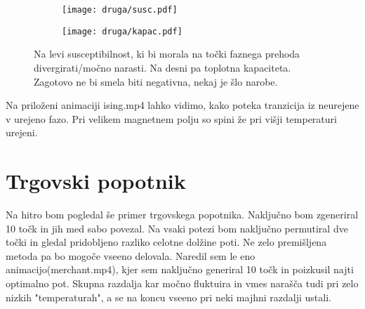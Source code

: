 \documentclass{article}
\begin{document}
\begin{figure}[H]
\centering
\begin{subfigure}{.49\textwidth}
\texttt{[image: druga/susc.pdf]}
\end{subfigure}
\begin{subfigure}{.49\textwidth}
\texttt{[image: druga/kapac.pdf]}
\end{subfigure}
\caption*{Na levi susceptibilnost, ki bi morala na točki faznega prehoda divergirati/močno narasti. Na desni pa  toplotna kapaciteta. Zagotovo ne bi smela biti negativna, nekaj je šlo narobe.}
\end{figure}

Na priloženi animaciji ising.mp4 lahko vidimo, kako poteka tranzicija iz neurejene v urejeno fazo. Pri velikem magnetnem polju so spini že pri višji temperaturi urejeni. 

\section{Trgovski popotnik}

Na hitro bom pogledal še primer trgovskega popotnika. Naključno bom zgeneriral 10 točk in jih med sabo povezal. Na vsaki potezi bom naključno permutiral dve točki in gledal pridobljeno razliko celotne dolžine poti. Ne zelo premišljena metoda pa bo mogoče vseeno delovala.
Naredil sem le eno animacijo(merchant.mp4), kjer sem naključno generiral 10 točk in poizkusil najti optimalno pot. Skupna razdalja kar močno fluktuira in vmes narašča tudi pri zelo nizkih "temperaturah", a se na koncu vseeno pri neki majhni razdalji ustali. 
\end{document}
